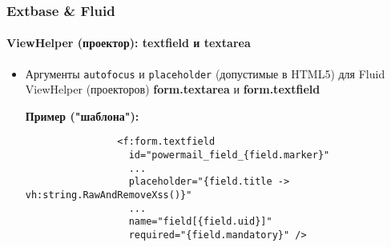 
\begin{frame}[fragile]
	\frametitle{Extbase \& Fluid}
	\framesubtitle{ViewHelper (проектор): textfield и textarea}

	\begin{itemize}
		\item Аргументы \texttt{autofocus} и \texttt{placeholder} (допустимые в HTML5) для Fluid ViewHelper (проекторов)
		\textbf{form.textarea} и \textbf{form.textfield}\newline

			\smaller\textbf{Пример ("шаблона"):}\normalsize
			\begin{lstlisting}
				<f:form.textfield
				  id="powermail_field_{field.marker}"
				  ...
				  placeholder="{field.title -> vh:string.RawAndRemoveXss()}"
				  ...
				  name="field[{field.uid}]"
				  required="{field.mandatory}" />
			\end{lstlisting}

	\end{itemize}

\end{frame}


